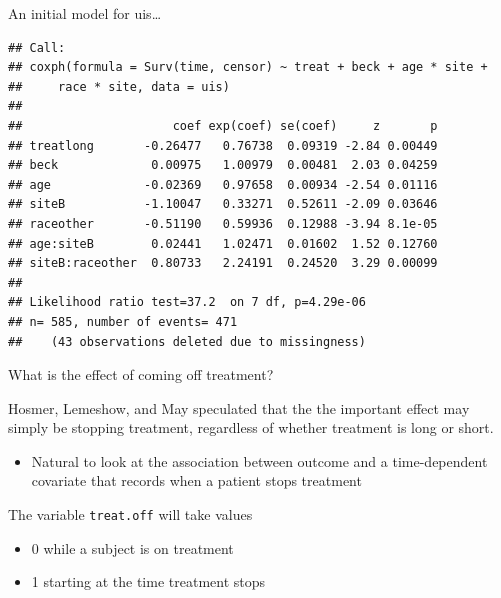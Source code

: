 \documentclass[ignorenonframetext,]{beamer}
\providecommand{\tightlist}{%
  \setlength{\itemsep}{0pt}\setlength{\parskip}{0pt}}
\begin{document}
\begin{frame}[fragile]{%
\protect\hypertarget{an-initial-model-for-uis-1}{%
An initial model for uis\ldots}}

\footnotesize

\begin{verbatim}
## Call:
## coxph(formula = Surv(time, censor) ~ treat + beck + age * site + 
##     race * site, data = uis)
## 
##                     coef exp(coef) se(coef)     z       p
## treatlong       -0.26477   0.76738  0.09319 -2.84 0.00449
## beck             0.00975   1.00979  0.00481  2.03 0.04259
## age             -0.02369   0.97658  0.00934 -2.54 0.01116
## siteB           -1.10047   0.33271  0.52611 -2.09 0.03646
## raceother       -0.51190   0.59936  0.12988 -3.94 8.1e-05
## age:siteB        0.02441   1.02471  0.01602  1.52 0.12760
## siteB:raceother  0.80733   2.24191  0.24520  3.29 0.00099
## 
## Likelihood ratio test=37.2  on 7 df, p=4.29e-06
## n= 585, number of events= 471 
##    (43 observations deleted due to missingness)
\end{verbatim}

\normalsize

\end{frame}

\begin{frame}{%
\protect\hypertarget{what-is-the-effect-of-coming-off-treatment}{%
What is the effect of coming off treatment?}}

Hosmer, Lemeshow, and May speculated that the the important effect may
simply be stopping treatment, regardless of whether treatment is long or
short.

\begin{itemize}
\tightlist
\item
  Natural to look at the association between outcome and a
  time-dependent covariate that records when a patient stops treatment
\end{itemize}

The variable \texttt{treat.off} will take values

\begin{itemize}
\item
  0 while a subject is on treatment
\item
  1 starting at the time treatment stops
\end{itemize}

\end{frame}
\end{document}
